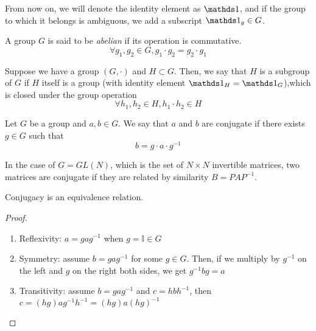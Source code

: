 From now on, we will denote the identity element as $\idop$, and if the group to which it belongs is ambiguous, we add a subscript $\idop_g \in G$.

\begin{definition}
    A group $G$ is said to be \emph{abelian} if its operation is commutative.
    \begin{equation}
        \forall g_1, g_2 \in G, g_1 \cdot g_2 = g_2 \cdot g_1
        \label{eq:abelian_group}
    \end{equation}
\end{definition}

\begin{definition}[Subgroup]
    Suppose we have a group $(G, \cdot)$ and $H \subset G$. Then, we say that $H$ is a subgroup of $G$ if $H$ itself is a group (with identity element $\idop_H = \idop_G$),which is closed under the group operation
    \begin{equation*}
        \forall h_1, h_2 \in H, h_1 \cdot h_2 \in H
    \end{equation*}
\end{definition}

\begin{definition}[Conjugation]
    Let $G$ be a group and $a, b \in G$. We say that $a$ and $b$ are conjugate if there exists $g \in G$ such that
    \begin{equation*}
        b = g \cdot a \cdot g^{-1}
    \end{equation*}
\end{definition}
\begin{example}
    In the case of $G = GL(N)$, which is the set of $N \times N$ invertible matrices, two matrices are conjugate if they are related by similarity $B = P A P^{-1}$.
\end{example}

\begin{proposition}
    Conjugacy is an equivalence relation.
\end{proposition}
\begin{proof}
    \begin{enumerate}
        \item Reflexivity: $a = gag^{-1}$ when $g = \mathbb{I} \in G$
        \item Symmetry: assume $b = gag^{-1}$ for some $g \in G$. Then, if we multiply by $g^{-1}$ on the left and $g$ on the right both sides, we get $g^{-1}bg = a$
        \item Transitivity: assume $b = gag^{-1}$ and $c=hbh^{-1}$, then $c = (hg)ag^{-1}h^{-1} = (hg)a(hg)^{-1}$
    \end{enumerate}
\end{proof}

